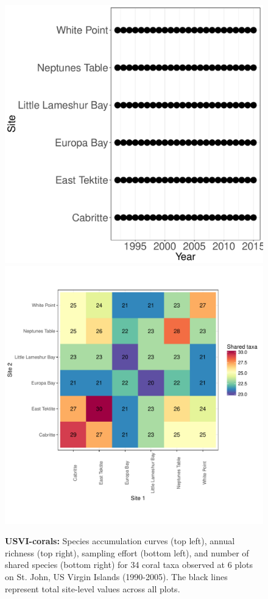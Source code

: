 \documentclass[11pt, oneside]{article}
\begin{document}
\begin{figure}[h!]
\includegraphics[scale = 0.4]{usvi-coral-castorani_spatiotemporal_sampling_effort.pdf}
\includegraphics[scale = 0.4]{usvi-coral-castorani_spp_shared.pdf}
\caption{{\bf USVI-corals:} Species accumulation curves (top left),  annual richness (top right), sampling effort (bottom left), and number of shared species (bottom right)  for 34 coral taxa observed at 6 plots on St. John, US Virgin Islands (1990-2005). The black lines represent total site-level values across all plots.}
\label{usvi-coral}
\end{figure}
\end{document}
